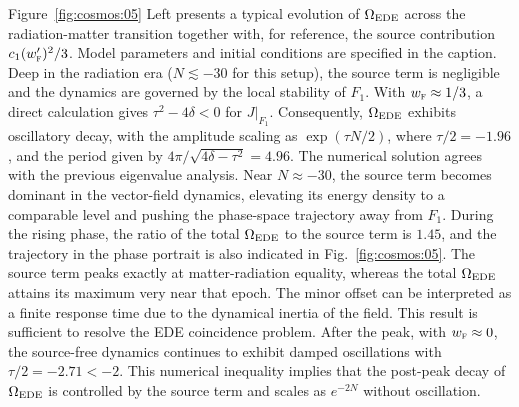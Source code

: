 \documentclass[aps,prd,twocolumn]{revtex4-2}
\newcommand\subEDE{{\rm EDE}}
\newcommand\subF{\textsc{f}}
\begin{document}
Figure~\ref{fig:cosmos:05} Left presents a typical evolution of $\Omega_\subEDE$ across the radiation-matter transition together with, for reference, the source contribution $c_1(w_\subF^\prime)^2/3$. Model parameters and initial conditions are specified in the caption. Deep in the radiation era ($N\lesssim-30$ for this setup), the source term is negligible and the dynamics are governed by the local stability of $F_1$. With $w_\subF\approx1/3$, a direct calculation gives $\tau^2-4\delta<0$ for $J|_{F_1}$. Consequently, $\Omega_\subEDE$ exhibits oscillatory decay, with the amplitude scaling as $\exp(\tau N/2)$, where $\tau/2=-1.96$, and the period given by $4\pi/\sqrt{4\delta-\tau^2}=4.96$. The numerical solution agrees with the previous eigenvalue analysis. Near $N\approx-30$, the source term becomes dominant in the vector-field dynamics, elevating its energy density to a comparable level and pushing the phase-space trajectory away from $F_1$. During the rising phase, the ratio of the total $\Omega_\subEDE$ to the source term is $1.45$, and the trajectory in the phase portrait is also indicated in Fig.~\ref{fig:cosmos:05}. The source term peaks exactly at matter-radiation equality, whereas the total $\Omega_\subEDE$ attains its maximum very near that epoch. The minor offset can be interpreted as a finite response time due to the dynamical inertia of the field. This result is sufficient to resolve the EDE coincidence problem. After the peak, with $w_\subF\approx0$, the source-free dynamics continues to exhibit damped oscillations with $\tau/2=-2.71<-2$. This numerical inequality implies that the post-peak decay of $\Omega_\subEDE$ is controlled by the source term and scales as $e^{-2N}$ without oscillation.
\end{document}
